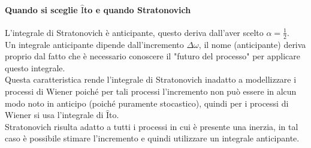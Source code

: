 \paragraph{Quando si sceglie $\hat{\mbox{I}}$to e quando Stratonovich}
L'integrale di Stratonovich è anticipante, questo deriva dall'aver scelto $\alpha  = \frac{1}{2}$. \\
Un integrale anticipante dipende dall'incremento $\Delta\omega$, il nome (anticipante) deriva proprio dal fatto che è necessario conoscere il "futuro del processo" per applicare questo integrale. \\
Questa caratteristica rende l'integrale di Stratonovich inadatto a modellizzare i processi di Wiener poiché per tali processi l'incremento non può essere in alcun modo noto in anticipo (poiché puramente stocastico), quindi per i processi di Wiener si usa l'integrale di $\hat{\mbox{I}}$to.\\
Stratonovich risulta adatto a tutti i processi in cui è presente una inerzia, in tal caso è possibile stimare l'incremento e quindi utilizzare un integrale anticipante.



